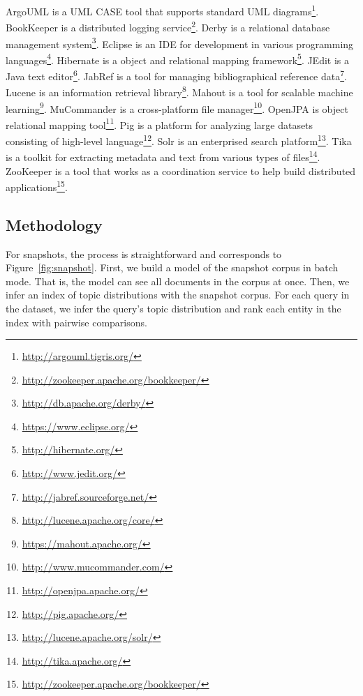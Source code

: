 ArgoUML is a UML CASE tool that supports standard UML diagrams\footnote{\url{http://argouml.tigris.org/}}.
BookKeeper is a distributed logging service\footnote{\url{http://zookeeper.apache.org/bookkeeper/}}.
Derby is a relational database management system\footnote{\url{http://db.apache.org/derby/}}.
Eclipse is an IDE for development in various programming languages\footnote{\url{https://www.eclipse.org/}}.
Hibernate is a object and relational mapping framework\footnote{\url{http://hibernate.org/}}.
JEdit is a Java text editor\footnote{\url{http://www.jedit.org/}}.
JabRef is a tool for managing bibliographical reference data\footnote{\url{http://jabref.sourceforge.net/}}.
Lucene is an information retrieval library\footnote{\url{http://lucene.apache.org/core/}}.
Mahout is a tool for scalable machine learning\footnote{\url{https://mahout.apache.org/}}.
MuCommander is a cross-platform file manager\footnote{\url{http://www.mucommander.com/}}.
OpenJPA is object relational mapping tool\footnote{\url{http://openjpa.apache.org/}}.
Pig is a platform for analyzing large datasets consisting of high-level language\footnote{\url{http://pig.apache.org/}}.
Solr is an enterprised search platform\footnote{\url{http://lucene.apache.org/solr/}}.
Tika is a toolkit for extracting metadata and text from various types of files\footnote{\url{http://tika.apache.org/}}.
ZooKeeper is a tool that works as a coordination service to help build distributed applications\footnote{\url{http://zookeeper.apache.org/bookkeeper/}}.



\subsection{Methodology}
\label{sec:methodology}

For snapshots, the process is straightforward and corresponds to
Figure~\ref{fig:snapshot}.  First, we build a model of the snapshot corpus in
batch mode.  That is, the model can see all documents in the corpus at once.
Then, we infer an index of topic distributions with the snapshot corpus.  For
each query in the dataset, we infer the query's topic distribution and rank each
entity in the index with pairwise comparisons.

